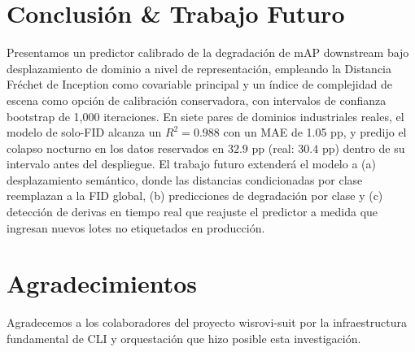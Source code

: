 \documentclass[10pt,twocolumn,letterpaper]{article}
\begin{document}
\section{Conclusión \& Trabajo Futuro}
Presentamos un predictor calibrado de la degradación de mAP downstream bajo desplazamiento de dominio a nivel de representación, empleando la Distancia Fr\'echet de Inception como covariable principal y un índice de complejidad de escena como opción de calibración conservadora, con intervalos de confianza bootstrap de 1,000 iteraciones. En siete pares de dominios industriales reales, el modelo de solo-FID alcanza un $R^2 = 0.988$ con un MAE de 1.05 pp, y predijo el colapso nocturno en los datos reservados en $32.9$ pp (real: $30.4$ pp) dentro de su intervalo antes del despliegue. El trabajo futuro extenderá el modelo a (a) desplazamiento semántico, donde las distancias condicionadas por clase reemplazan a la FID global, (b) predicciones de degradación por clase y (c) detección de derivas en tiempo real que reajuste el predictor a medida que ingresan nuevos lotes no etiquetados en producción.

\section{Agradecimientos}
Agradecemos a los colaboradores del proyecto wisrovi-suit por la infraestructura fundamental de CLI y orquestación que hizo posible esta investigación.



\end{document}
